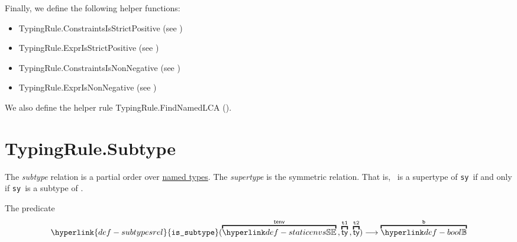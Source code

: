 \documentclass{book}
\newcommand\subtypesrel[0]{\hyperlink{def-subtypesrel}{\texttt{is\_subtype}}}
\newcommand\tsy[0]{\texttt{sy}}
\begin{document}
Finally, we define the following helper functions:
\begin{itemize}
  \item TypingRule.ConstraintsIsStrictPositive (see )
  \item TypingRule.ExprIsStrictPositive (see )
  \item TypingRule.ConstraintsIsNonNegative (see )
  \item TypingRule.ExprIsNonNegative (see )
\end{itemize}

We also define the helper rule TypingRule.FindNamedLCA ().

\section{TypingRule.Subtype\label{sec:TypingRule.Subtype}}
The \emph{subtype} relation is a partial order over \underline{named types}.
The \emph{supertype} is the symmetric relation. That is, \tty\ is a supertype of \tsy\ if and only if \tsy\ is a subtype of \tty.

\hypertarget{def-subtypesrel}{}
The predicate
\[
  \subtypesrel(\overname{\staticenvs}{\tenv} \aslsep \overname{\ty}{\vtone} \aslsep \overname{\ty}{\vttwo})
  \aslto \overname{\Bool}{\vb}
\]
\end{document}
